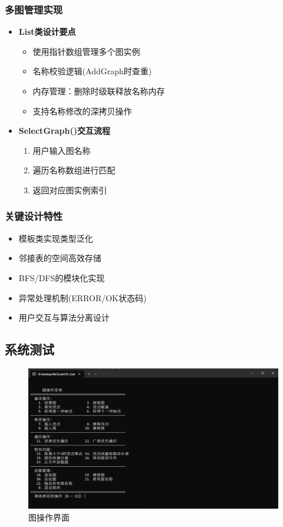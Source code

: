\documentclass[supercite]{Experimental_Report}
\theoremstyle{definition}
\begin{document}
\subsubsection*{多图管理实现}
\begin{itemize}
    \item \textbf{List类设计要点}
    \begin{itemize}
        \item 使用指针数组管理多个图实例
        \item 名称校验逻辑(AddGraph时查重)
        \item 内存管理：删除时级联释放名称内存
        \item 支持名称修改的深拷贝操作
    \end{itemize}
    
    \item \textbf{SelectGraph()交互流程}
    \begin{enumerate}
        \item 用户输入图名称
        \item 遍历名称数组进行匹配
        \item 返回对应图实例索引
    \end{enumerate}
\end{itemize}

\subsubsection*{关键设计特性}
\begin{itemize}
    \item 模板类实现类型泛化
    \item 邻接表的空间高效存储
    \item BFS/DFS的模块化实现
    \item 异常处理机制(ERROR/OK状态码)
    \item 用户交互与算法分离设计
\end{itemize}


\subsection{系统测试}

\begin{figure}[htb]
	\begin{center}
		\includegraphics[scale=0.30]{images/2-1.jpg}
		\caption{图操作界面}
		\label{fig1-1}
	\end{center}
\end{figure}
\end{document}
